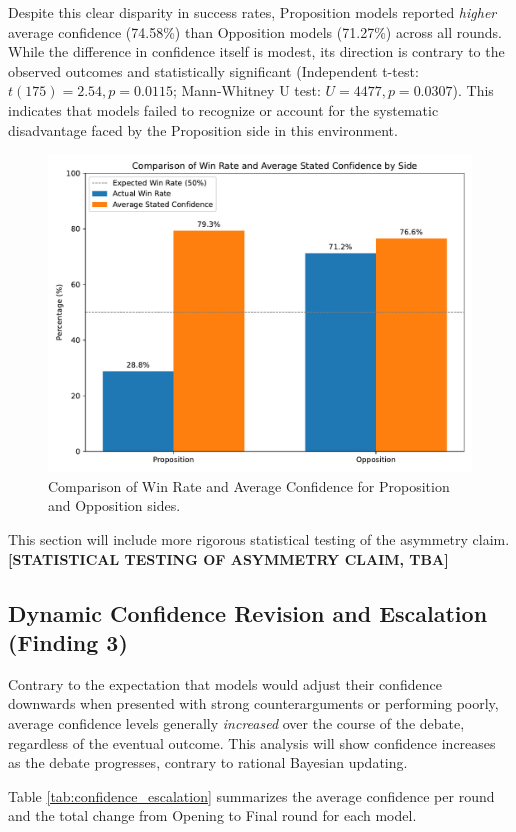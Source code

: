 \documentclass{article}
\begin{document}
Despite this clear disparity in success rates, Proposition models reported \textit{higher} average confidence (74.58\%) than Opposition models (71.27\%) across all rounds. While the difference in confidence itself is modest, its direction is contrary to the observed outcomes and statistically significant (Independent t-test: $t(175) = 2.54, p = 0.0115$; Mann-Whitney U test: $U=4477, p = 0.0307$). This indicates that models failed to recognize or account for the systematic disadvantage faced by the Proposition side in this environment.

\begin{figure}[h]
  \centering
  \includegraphics[width=0.8\linewidth]{figures/side_winrate_confidence_comparison.pdf}
  \caption{Comparison of Win Rate and Average Confidence for Proposition and Opposition sides.}
  \label{fig:position_bias}
\end{figure}

This section will include more rigorous statistical testing of the asymmetry claim. \textbf{[STATISTICAL TESTING OF ASYMMETRY CLAIM, TBA]}

\subsection{Dynamic Confidence Revision and Escalation (Finding 3)}

Contrary to the expectation that models would adjust their confidence downwards when presented with strong counterarguments or performing poorly, average confidence levels generally \textit{increased} over the course of the debate, regardless of the eventual outcome. This analysis will show confidence increases as the debate progresses, contrary to rational Bayesian updating.

Table \ref{tab:confidence_escalation} summarizes the average confidence per round and the total change from Opening to Final round for each model.
\end{document}
